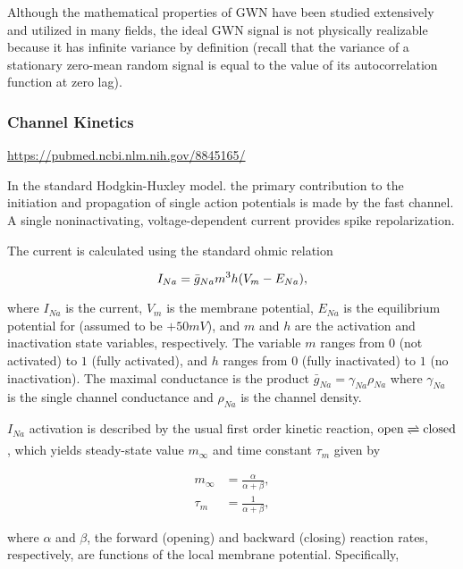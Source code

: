 Although the mathematical properties of GWN have been studied extensively and utilized in many fields, the ideal GWN signal is not physically realizable because it has infinite variance by definition (recall that the variance of a stationary zero-mean random signal is equal to the value of its autocorrelation function at zero lag).


\subsubsection{Channel Kinetics}

\url{https://pubmed.ncbi.nlm.nih.gov/8845165/}

In the standard Hodgkin-Huxley model. the primary contribution to the initiation and propagation of single action potentials is made by the fast \Na channel. A single noninactivating, voltage-dependent \K current provides spike repolarization. 

The \Na current is calculated using the standard ohmic relation

\begin{equation*}
    I_{Na} = \bar{g}_{Na} m^3 h \qty(V_m - E_{Na}),
\end{equation*}

where $I_{Na}$ is the \Na current, $V_m$ is the membrane potential, $E_{Na}$ is the equilibrium potential for \Na (assumed to be $+50 mV$), and $m$ and $h$ are the activation and inactivation state variables, respectively. The variable $m$ ranges from $0$ (not activated) to $1$ (fully activated), and $h$ ranges from $0$ (fully inactivated) to $1$ (no inactivation). The maximal conductance is the product $\bar{g}_{Na} = \gamma_{Na} \rho_{Na}$ where $\gamma_{Na}$ is the single channel conductance and $\rho_{Na}$ is the channel density. 

$I_{Na}$ activation is described by the usual first order kinetic reaction, $\text{open} \xrightleftharpoons[]{} \text{closed}$, which yields steady-state value $m_\infty$ and time constant $\tau_m$ given by 

\begin{align*}
    m_\infty &= \frac{\alpha}{\alpha + \beta}, 
    \\ 
    \tau_m &= \frac{1}{\alpha + \beta},
\end{align*}

where $\alpha$ and $\beta$, the forward (opening) and backward (closing) reaction rates, respectively, are functions of the local membrane potential. Specifically, 

